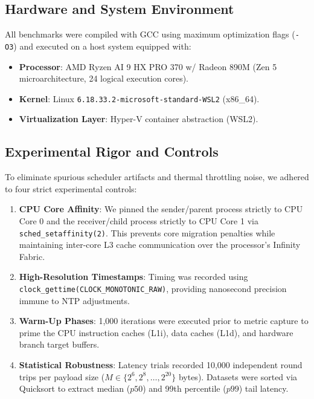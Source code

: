 \documentclass[conference]{IEEEtran}
\begin{document}
\subsection{Hardware and System Environment}
All benchmarks were compiled with GCC using maximum optimization flags (\texttt{-O3}) and executed on a host system equipped with:
\begin{itemize}
    \item \textbf{Processor}: AMD Ryzen AI 9 HX PRO 370 w/ Radeon 890M (Zen 5 microarchitecture, 24 logical execution cores).
    \item \textbf{Kernel}: Linux \texttt{6.18.33.2-microsoft-standard-WSL2} (x86\_64).
    \item \textbf{Virtualization Layer}: Hyper-V container abstraction (WSL2).
\end{itemize}

\subsection{Experimental Rigor and Controls}
To eliminate spurious scheduler artifacts and thermal throttling noise, we adhered to four strict experimental controls:
\begin{enumerate}
    \item \textbf{CPU Core Affinity}: We pinned the sender/parent process strictly to CPU Core 0 and the receiver/child process strictly to CPU Core 1 via \texttt{sched\_setaffinity(2)}. This prevents core migration penalties while maintaining inter-core L3 cache communication over the processor's Infinity Fabric.
    \item \textbf{High-Resolution Timestamps}: Timing was recorded using \texttt{clock\_gettime(CLOCK\_MONOTONIC\_RAW)}, providing nanosecond precision immune to NTP adjustments.
    \item \textbf{Warm-Up Phases}: 1,000 iterations were executed prior to metric capture to prime the CPU instruction caches (L1i), data caches (L1d), and hardware branch target buffers.
    \item \textbf{Statistical Robustness}: Latency trials recorded 10,000 independent round trips per payload size ($M \in \{2^6, 2^8, \dots, 2^{20}\}$ bytes). Datasets were sorted via Quicksort to extract median ($p50$) and 99th percentile ($p99$) tail latency.
\end{enumerate}
\end{document}
